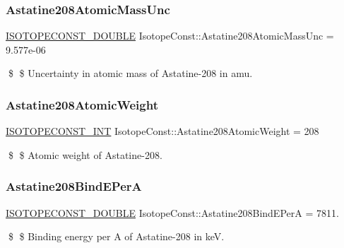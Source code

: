 \subsubsection{\texorpdfstring{Astatine208\+Atomic\+Mass\+Unc}{Astatine208AtomicMassUnc}}
{\footnotesize\ttfamily \mbox{\hyperlink{group___isotope_const-_macros_ga8f45a7272ce02c0b4c65c44636ed719a}{I\+S\+O\+T\+O\+P\+E\+C\+O\+N\+S\+T\+\_\+\+D\+O\+U\+B\+LE}} Isotope\+Const\+::\+Astatine208\+Atomic\+Mass\+Unc = 9.\+577e-\/06}

\$ \$ Uncertainty in atomic mass of Astatine-\/208 in amu. \mbox{\label{group___isotope_const-_astatine-_at208_ga2c23b69beeecca0b509d4b24ab98320a}} 
\subsubsection{\texorpdfstring{Astatine208\+Atomic\+Weight}{Astatine208AtomicWeight}}
{\footnotesize\ttfamily \mbox{\hyperlink{group___isotope_const-_macros_ga5f18360b3e99483a35c32d789e62621c}{I\+S\+O\+T\+O\+P\+E\+C\+O\+N\+S\+T\+\_\+\+I\+NT}} Isotope\+Const\+::\+Astatine208\+Atomic\+Weight = 208}

\$ \$ Atomic weight of Astatine-\/208. \mbox{\label{group___isotope_const-_astatine-_at208_ga7b56594f9fcbb1eb86912de64ecc628f}} 
\subsubsection{\texorpdfstring{Astatine208\+Bind\+E\+PerA}{Astatine208BindEPerA}}
{\footnotesize\ttfamily \mbox{\hyperlink{group___isotope_const-_macros_ga8f45a7272ce02c0b4c65c44636ed719a}{I\+S\+O\+T\+O\+P\+E\+C\+O\+N\+S\+T\+\_\+\+D\+O\+U\+B\+LE}} Isotope\+Const\+::\+Astatine208\+Bind\+E\+PerA = 7811.}

\$ \$ Binding energy per A of Astatine-\/208 in keV. \mbox{\label{group___isotope_const-_astatine-_at208_ga8a4931aebdde25691960a9b6dacb9061}} 
